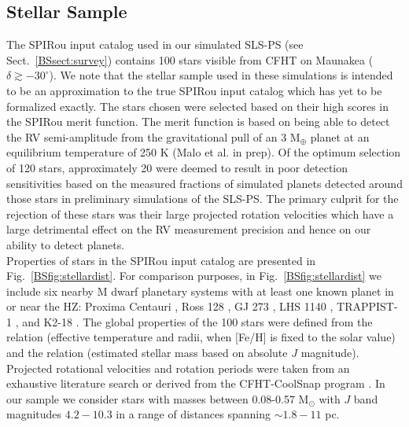 \subsection{Stellar Sample} \label{BSsect:starsamplesub}
The SPIRou input catalog used in our simulated SLS-PS (see Sect.~\ref{BSsect:survey})
contains 100 stars visible from CFHT on Maunakea
($\delta \gtrsim -30^{\circ}$). We note that the stellar sample used in these simulations is intended to be an
approximation to the true SPIRou input catalog which has yet to be formalized exactly. The stars chosen
were selected based on their high scores in the
SPIRou merit function. The merit function is based on being able to detect the RV semi-amplitude
from the gravitational pull of an 3 M$_{\oplus}$ planet at an equilibrium temperature of 250 K (Malo et al. in prep).
Of the optimum selection of 120 stars, approximately 20 were
deemed to result in poor detection sensitivities based on 
the measured fractions of simulated planets detected around those stars in preliminary simulations
of the SLS-PS. The primary
culprit for the rejection of these stars was their large projected rotation
velocities \vsini{,} which have a large detrimental effect on the RV measurement
precision and hence on our ability to detect planets.  \\

Properties of stars in the SPIRou input catalog are presented in Fig.~\ref{BSfig:stellardist}.
For comparison purposes, in Fig.~\ref{BSfig:stellardist} we include six nearby M dwarf
planetary systems with at least one known planet in or near the HZ: 
Proxima Centauri \citep{angladaescude16}, Ross 128 \citep{bonfils17a},
GJ 273 \citep{astudillodefru17a}, LHS 1140 \citep{dittmann17a}, TRAPPIST-1 \citep{gillon17},
and K2-18 \citep{montet15, cloutier17b}.
The global properties of the 100 stars were defined from the \cite{boyajian12} relation (effective
temperature and radii, when [Fe/H] is fixed to the solar value) and the \cite{delfosse00} relation
(estimated stellar mass based on absolute $J$ magnitude).
Projected rotational velocities and rotation periods were taken
from an exhaustive literature search or derived from the CFHT-CoolSnap program
\citep{moutou17}. In our sample
we consider stars with masses between 0.08-0.57 M$_{\odot}$ with $J$ band magnitudes $4.2-10.3$ in
a range of distances spanning $\sim 1.8-11$ pc. \\

